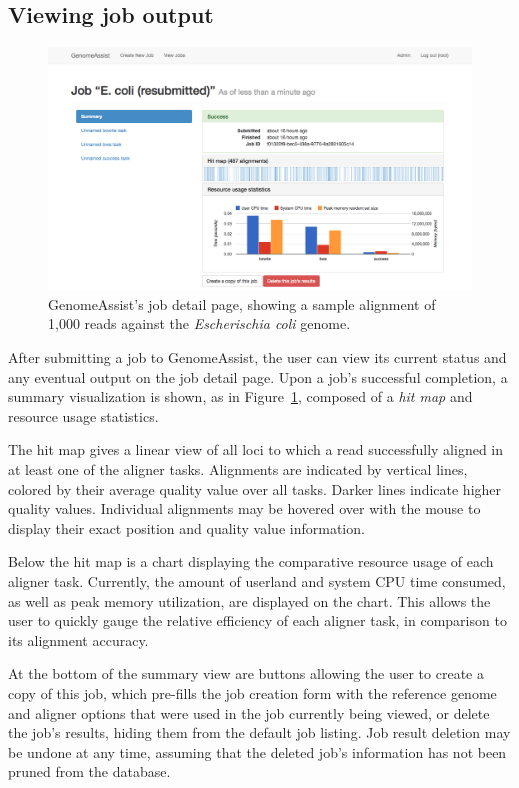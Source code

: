 \documentclass[11pt,twocolumn]{article}
\begin{document}
\subsection{Viewing job output}
\label{sec:detail}

\begin{figure}
\includegraphics[width=\textwidth]{screenshots/detail-full}

\caption{
    \label{fig:detail}
    GenomeAssist's job detail page, showing a sample alignment of
    1,000 reads against the \textit{Escherischia coli} genome.
}
\end{figure}

After submitting a job to GenomeAssist, the user can view its current
status and any eventual output on the job detail page.
Upon a job's successful completion, a summary visualization is shown, as
in Figure~\ref{fig:detail}, composed of a \textit{hit map} and resource
usage statistics.

The hit map gives a linear view of all loci to which a read successfully
aligned in at least one of the aligner tasks.
Alignments are indicated by vertical lines, colored by their average
quality value over all tasks.
Darker lines indicate higher quality values.
Individual alignments may be hovered over with the mouse to display
their exact position and quality value information.

Below the hit map is a chart displaying the comparative resource usage
of each aligner task.
Currently, the amount of userland and system CPU time consumed, as well
as peak memory utilization, are displayed on the chart.
This allows the user to quickly gauge the relative efficiency of each
aligner task, in comparison to its alignment accuracy.

At the bottom of the summary view are buttons allowing the user to
create a copy of this job, which pre-fills the job creation form with
the reference genome and aligner options that were used in the job
currently being viewed, or delete the job's results, hiding them from
the default job listing.
Job result deletion may be undone at any time, assuming that the deleted
job's information has not been pruned from the database.
\end{document}
